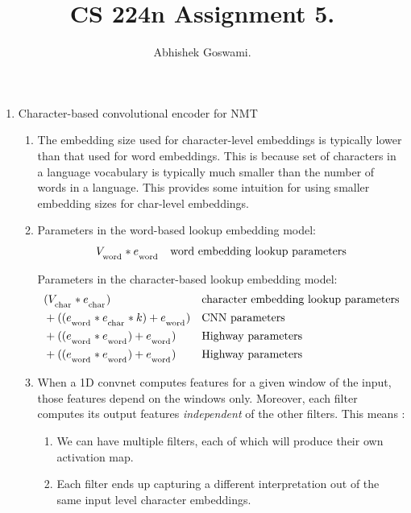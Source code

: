 \documentclass[]{article}
\begin{document}
\title{CS 224n Assignment 5.}
\author{Abhishek Goswami.}
\maketitle

\begin{enumerate}
	\item Character-based convolutional encoder for NMT
	\begin{enumerate}
		\item
		
		The embedding size used for character-level embeddings is typically lower than that used for word embeddings. This is because set of characters in a language vocabulary is typically much smaller than the number of words in a language. This provides some intuition for using smaller embedding sizes for char-level embeddings.
		
		\item
		
Parameters in the word-based lookup embedding model:		
\begin{align*}
V_\textsubscript{word} * e_\textsubscript{word} && \text{word embedding lookup parameters}
\end{align*}


Parameters in the character-based lookup embedding model:
\begin{align*}
& (V_\textsubscript{char} * e_\textsubscript{char}) && \text{character embedding lookup parameters} \\
& + ((e_\textsubscript{word} * e_\textsubscript{char} * k) + e_\textsubscript{word})  && \text{CNN parameters } \\
& + ((e_\textsubscript{word} * e_\textsubscript{word}) + e_\textsubscript{word}) && \text{Highway parameters } \\
& + ((e_\textsubscript{word} * e_\textsubscript{word}) + e_\textsubscript{word}) && \text{Highway parameters }
\end{align*}

		
		\item
		
		When a 1D convnet computes features for a given window of the input, those features depend on the windows only. Moreover, each filter computes its output features \textit{independent} of the other filters. This means :
			\begin{enumerate}
			\item We can have multiple filters, each of which will produce their own activation map.
			\item Each filter ends up capturing a different  interpretation out of the same input level character embeddings.
			\end{enumerate}
		

\end{enumerate}
\end{enumerate}
\end{document}

